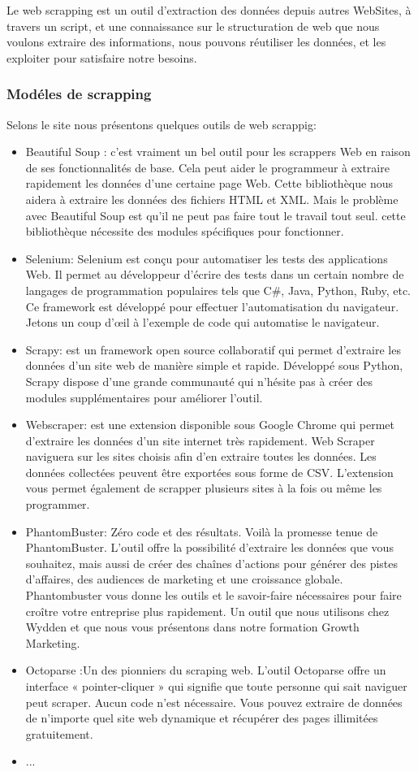 \documentclass[12pt]{report}
\begin{document}
Le web scrapping est un outil d'extraction des données depuis autres WebSites, à travers un script, et une connaissance sur le structuration de web que nous voulons extraire des informations, nous pouvons réutiliser les données, et les exploiter pour satisfaire notre besoins.
\subsubsection{Modéles de scrapping}

Selons le site \cite{42} nous présentons quelques outils de web scrappig: 
\begin{itemize}
\item Beautiful Soup : c'est vraiment un bel outil pour les scrappers Web en raison de ses fonctionnalités de base. Cela peut aider le programmeur à extraire rapidement les données d'une certaine page Web. Cette bibliothèque nous aidera à extraire les données des fichiers HTML et XML. Mais le problème avec Beautiful Soup est qu'il ne peut pas faire tout le travail tout seul. cette bibliothèque nécessite des modules spécifiques pour fonctionner.
\item Selenium: Selenium est conçu pour automatiser les tests des applications Web. Il permet au développeur d'écrire des tests dans un certain nombre de langages de programmation populaires tels que C\#, Java, Python, Ruby, etc. Ce framework est développé pour effectuer l'automatisation du navigateur. Jetons un coup d'œil à l'exemple de code qui automatise le navigateur.
\item Scrapy: est un framework open source collaboratif qui permet d’extraire les données d’un site web de manière simple et rapide. Développé sous Python, Scrapy dispose d’une grande communauté qui n’hésite pas à créer des modules supplémentaires pour améliorer l’outil.
\item Webscraper: est une extension disponible sous Google Chrome qui permet d’extraire les données d’un site internet très rapidement. Web Scraper naviguera sur les sites choisis afin d’en extraire toutes les données. Les données collectées peuvent être exportées sous forme de CSV. L’extension vous permet également de scrapper plusieurs sites à la fois ou même les programmer.
\item PhantomBuster: Zéro code et des résultats. Voilà la promesse tenue de PhantomBuster. L’outil offre la possibilité d’extraire les données que vous souhaitez, mais aussi de créer des chaînes d’actions pour générer des pistes d’affaires, des audiences de marketing et une croissance globale. Phantombuster vous donne les outils et le savoir-faire nécessaires pour faire croître votre entreprise plus rapidement. Un outil que nous utilisons chez Wydden et que nous vous présentons dans notre formation Growth Marketing.
\item Octoparse :Un des pionniers du scraping web. L’outil Octoparse offre un interface « pointer-cliquer » qui signifie que toute personne qui sait naviguer peut scraper. Aucun code n’est nécessaire. Vous pouvez extraire de données de n’importe quel site web dynamique et récupérer des pages illimitées gratuitement.
\item ...
\end{itemize}
\end{document}
